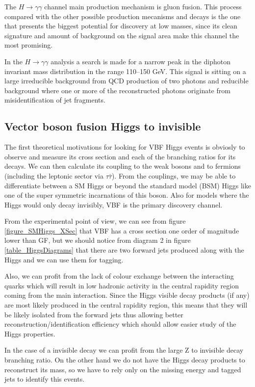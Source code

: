 \documentclass[%
reprint,
amsmath,
amssymb,
aps,
pra,
showkeys
]{revtex4-1}
\begin{document}
The $H \rightarrow \gamma\gamma$ channel main production mechanism is gluon fusion. This process compared with the 
other possible production mecanisms and decays is the one that presents the biggest potential for discovery at low
masses, since its clean signature and amount of background on the signal area make this channel the most promising.

In the $H \rightarrow \gamma\gamma$ analysis a search is made for a narrow peak in the diphoton invariant mass
distribution in the range 110–150 GeV. This signal is sitting on a large irreducible background from QCD production 
of two photons and reducible background where one or more of the reconstructed photons originate from 
misidentification of jet fragments.

\subsection{Vector boson fusion Higgs to invisible}

The first theoretical motivations for looking for VBF Higgs events is obviosly to observe and measure its
cross section and each of the branching ratios for its decays. We can then calculate its coupling to the
weak bosons and to fermions (including the leptonic sector via $\tau\bar{\tau}$). From the couplings, we may be able 
to differentiate between a SM Higgs or beyond the standard model (BSM) Higgs like one of the super symmetric
incarnations of this boson\cite{article:Duhrssen:2004cv,article:Zeppenfeld:2000td}. Also for models where the Higgs 
would only decay invisibly, VBF is the primary discovery channel.

From the experimental point of view, we can see from figure \ref{figure_SMHiggs_XSec} that VBF has a cross section
one order of magnitude lower than GF, but we should notice from diagram 2 in figure \ref{table_HiggsDiagrams} that
there are two forward jets produced along with the Higgs and we can use them for tagging. 

Also, we can profit from the lack of colour exchange between the interacting quarks which will result in low hadronic activity in the
central rapidity region coming from the main interaction. Since the Higgs visible decay products (if any) are most 
likely produced in the central rapidity region, this means that they will be likely isolated from the forward jets 
thus allowing better reconstruction/identification efficiency which should allow easier study of the Higgs properties.

In the case of a invisible decay we can profit from the large Z to invisible decay branching ratio. On the other hand
we do not have the Higgs decay products to reconstruct its mass, so we have to rely only on the missing energy and 
tagged jets to identify this events.
\end{document}
